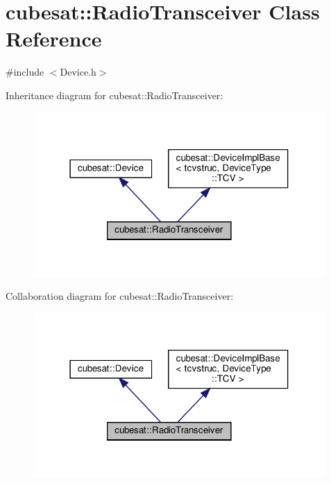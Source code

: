 \hypertarget{classcubesat_1_1RadioTransceiver}{}\section{cubesat\+:\+:Radio\+Transceiver Class Reference}
\label{classcubesat_1_1RadioTransceiver}


{\ttfamily \#include $<$Device.\+h$>$}



Inheritance diagram for cubesat\+:\+:Radio\+Transceiver\+:
\nopagebreak
\begin{figure}[H]
\begin{center}
\leavevmode
\includegraphics[width=316pt]{classcubesat_1_1RadioTransceiver__inherit__graph}
\end{center}
\end{figure}


Collaboration diagram for cubesat\+:\+:Radio\+Transceiver\+:
\nopagebreak
\begin{figure}[H]
\begin{center}
\leavevmode
\includegraphics[width=316pt]{classcubesat_1_1RadioTransceiver__coll__graph}
\end{center}
\end{figure}
